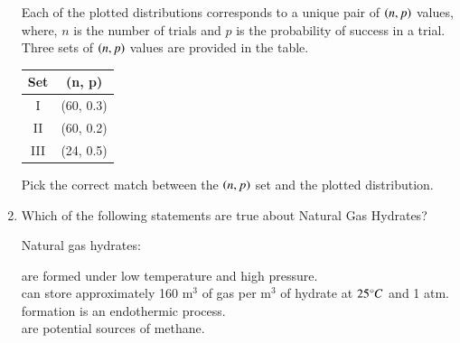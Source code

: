 \documentclass[journal,12pt,onecolumn]{IEEEtran}
\theoremstyle{remark}
\begin{document}
\begin{enumerate}
Each of the plotted distributions corresponds to a unique pair of $\left(n, p\right)$ values, where, $n$ is the number of trials and $p$ is the probability of success in a trial. Three sets of $\left(n, p\right)$ values are provided in the table.

\hfill{}

\begin{center}
\begin{tabular}{|c|c|}
\hline
Set & (n, p) \\
\hline
I & (60, 0.3) \\
II & (60, 0.2) \\
III & (24, 0.5) \\
\hline
\end{tabular}
\end{center}

Pick the correct match between the $\left(n, p\right)$ set and the plotted distribution.

\begin{enumerate}
\end{enumerate}

\item Which of the following statements are true about Natural Gas Hydrates?

\hfill{}

\noindent
Natural gas hydrates:

\noindent
{} are formed under low temperature and high pressure.\\
 can store approximately 160 m$^3$ of gas per m$^3$ of hydrate at $25{\degree}C$ and 1 atm.\\
 formation is an endothermic process.\\
 are potential sources of methane.


\begin{enumerate} 
\end{enumerate}


\end{enumerate}
\end{document}
